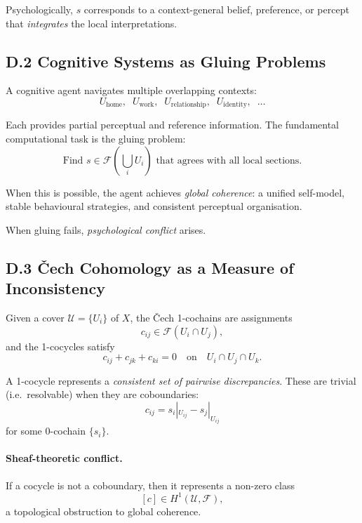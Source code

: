 \documentclass[11pt,a4paper,twoside]{article}
\begin{document}
Psychologically, $s$ corresponds to a context-general belief, preference, or percept that \emph{integrates} the local interpretations.

\subsection*{D.2 Cognitive Systems as Gluing Problems}

A cognitive agent navigates multiple overlapping contexts:
\[
U_\text{home},\;\; U_\text{work},\;\; U_\text{relationship},\;\; U_\text{identity},\;\; \ldots
\]

Each provides partial perceptual and reference information. The fundamental computational task is the gluing problem:
\[
\text{Find } s \in \mathscr{F}\!\left(\bigcup_i U_i\right) \text{ that agrees with all local sections.}
\]

When this is possible, the agent achieves \emph{global coherence}: a unified self-model, stable behavioural strategies, and consistent perceptual organisation.

When gluing fails, \emph{psychological conflict} arises.

\subsection*{D.3 Čech Cohomology as a Measure of Inconsistency}

Given a cover $\mathcal{U} = \{U_i\}$ of $X$, the Čech 1-cochains are assignments
\[
c_{ij} \in \mathscr{F}(U_i \cap U_j),
\]
and the 1-cocycles satisfy
\[
c_{ij} + c_{jk} + c_{ki} = 0 \quad \text{on} \quad U_i \cap U_j \cap U_k.
\]

A 1-cocycle represents a \emph{consistent set of pairwise discrepancies}. These are trivial (i.e.\ resolvable) when they are coboundaries:
\[
c_{ij} = s_i|_{U_{ij}} - s_j|_{U_{ij}}
\]
for some 0-cochain $\{s_i\}$.

\paragraph{Sheaf-theoretic conflict.}
If a cocycle is not a coboundary, then it represents a non-zero class
\[
[c] \in H^1(\mathcal{U},\mathscr{F}),
\]
a topological obstruction to global coherence.

\begin{center}
\end{center}
\end{document}

